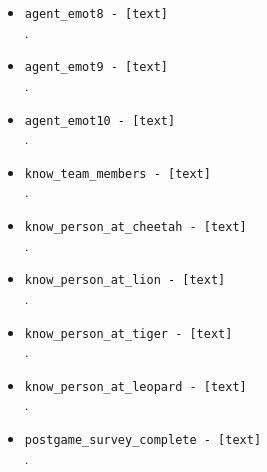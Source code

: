 \begin{description}
\begin{addmargin}[0em]{0em}
\begin{addmargin}[1em]{0em}
\begin{itemize}
            \item \verb|agent_emot8 - [text]|\\.
            \item \verb|agent_emot9 - [text]|\\.
            \item \verb|agent_emot10 - [text]|\\.
            \item \verb|know_team_members - [text]|\\.
            \item \verb|know_person_at_cheetah - [text]|\\.
            \item \verb|know_person_at_lion - [text]|\\.
            \item \verb|know_person_at_tiger - [text]|\\.
            \item \verb|know_person_at_leopard - [text]|\\.
            \item \verb|postgame_survey_complete - [text]|\\.
        \end{itemize}
    \end{addmargin} %
\end{addmargin} %



\end{description}
